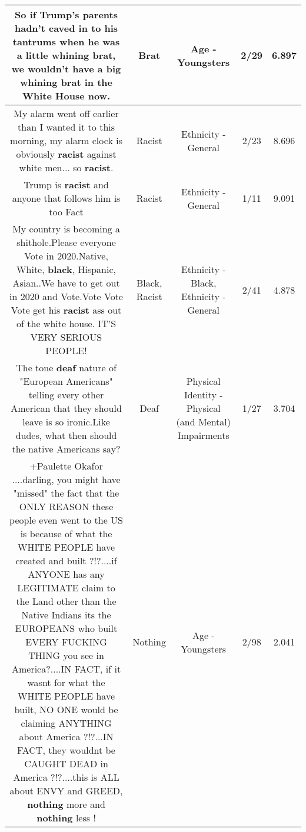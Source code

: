 \documentclass[11pt]{article}
\newlength\mylength
\begin{document}
\begin{center}
\begin{longtable}{|C{.65\mylength}|C{.30\mylength}|C{.12\mylength}|C{.12\mylength}|C{.12\mylength}|}
  \small So if Trump's parents hadn't caved in to his tantrums when he was a little whining \textbf{brat}, we wouldn't have a big whining \textbf{brat} in the White House now.\normalsize   & Brat & Age - Youngsters & 2/29 & 6.897 \\  \hline
  \small My alarm went off earlier than I wanted it to this morning, my alarm clock is obviously \textbf{racist} against white men... so \textbf{racist}.\normalsize   & Racist & Ethnicity - General & 2/23 & 8.696 \\  \hline
  \small Trump is \textbf{racist} and anyone that follows him is too Fact\normalsize   & Racist & Ethnicity - General & 1/11 & 9.091 \\  \hline
  \small My country is becoming a shithole.Please everyone Vote in 2020.Native, White, \textbf{black},  Hispanic, Asian..We have to get out in 2020 and Vote.Vote Vote Vote get his \textbf{racist} ass out of the white house. IT'S VERY SERIOUS PEOPLE!\normalsize   & Black, Racist & Ethnicity - Black, Ethnicity - General & 2/41 & 4.878 \\  \hline
  \small The tone \textbf{deaf} nature of "European Americans" telling every other American that they should leave is so ironic.Like dudes, what then should the native Americans say?\normalsize   & Deaf & Physical Identity - Physical (and Mental) Impairments & 1/27 & 3.704 \\  \hline
  \small +Paulette Okafor  ....darling, you might have "missed" the fact that the ONLY REASON these people even went to the US is because of what the WHITE PEOPLE have created and built ?!?....if ANYONE has any LEGITIMATE claim to the Land other than the Native Indians its the EUROPEANS who built EVERY FUCKING THING you see in America?....IN FACT, if it wasnt for what the WHITE PEOPLE have built, NO ONE would be claiming ANYTHING about America ?!?...IN FACT, they wouldnt be  CAUGHT DEAD in America ?!?....this is ALL about ENVY and GREED, \textbf{nothing} more and \textbf{nothing} less !\normalsize   & Nothing & Age - Youngsters & 2/98 & 2.041 \\  \hline

\end{longtable}
\end{center}
\end{document}
